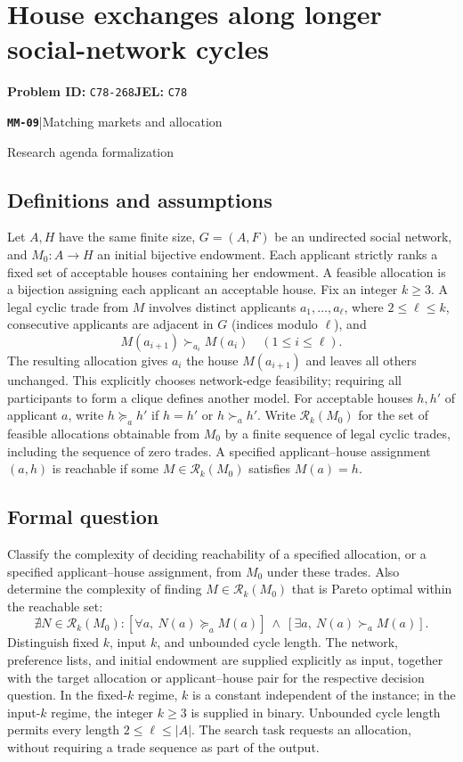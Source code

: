 \documentclass[11pt,a4paper]{article}
\newcommand{\entrymeta}[3]{{\sffamily\small\color{muted}\textbf{\texttt{#1}}\quad|\quad #2\par #3\par}}
\begin{document}
\section*{House exchanges along longer social-network cycles}
\textbf{Problem ID:} \texttt{C78-268}\quad \textbf{JEL:} \texttt{C78}\par
\label{problem:OP-0550}
\label{beyond:MM-09}
\entrymeta{MM-09}{Matching markets and allocation}{Research agenda formalization}
\subsection*{Definitions and assumptions}
Let $A,H$ have the same finite size, $G=(A,F)$ be an undirected social network, and $M_0:A\to H$ an initial bijective endowment. Each applicant strictly ranks a fixed set of acceptable houses containing her endowment. A feasible allocation is a bijection assigning each applicant an acceptable house. Fix an integer $k\ge3$. A legal cyclic trade from $M$ involves distinct applicants $a_1,\ldots,a_\ell$, where $2\le\ell\le k$, consecutive applicants are adjacent in $G$ (indices modulo $\ell$), and
\[
 M(a_{i+1})\succ_{a_i}M(a_i)\quad(1\le i\le\ell).
\]
The resulting allocation gives $a_i$ the house $M(a_{i+1})$ and leaves all others unchanged. This explicitly chooses network-edge feasibility; requiring all participants to form a clique defines another model.
For acceptable houses $h,h'$ of applicant $a$, write $h\succeq_a h'$ if $h=h'$ or $h\succ_a h'$. Write $\mathcal R_k(M_0)$ for the set of feasible allocations obtainable from $M_0$ by a finite sequence of legal cyclic trades, including the sequence of zero trades. A specified applicant--house assignment $(a,h)$ is reachable if some $M\in\mathcal R_k(M_0)$ satisfies $M(a)=h$.
\subsection*{Formal question}
Classify the complexity of deciding reachability of a specified allocation, or a specified applicant--house assignment, from $M_0$ under these trades. Also determine the complexity of finding $M\in\mathcal R_k(M_0)$ that is Pareto optimal within the reachable set:
\[
 \nexists N\in\mathcal R_k(M_0):
 [\forall a,\ N(a)\succeq_a M(a)]\ \land\
 [\exists a,\ N(a)\succ_a M(a)].
\]
Distinguish fixed $k$, input $k$, and unbounded cycle length.
The network, preference lists, and initial endowment are supplied explicitly as input, together with the target allocation or applicant--house pair for the respective decision question. In the fixed-$k$ regime, $k$ is a constant independent of the instance; in the input-$k$ regime, the integer $k\ge3$ is supplied in binary. Unbounded cycle length permits every length $2\le\ell\le |A|$. The search task requests an allocation, without requiring a trade sequence as part of the output.
\end{document}
